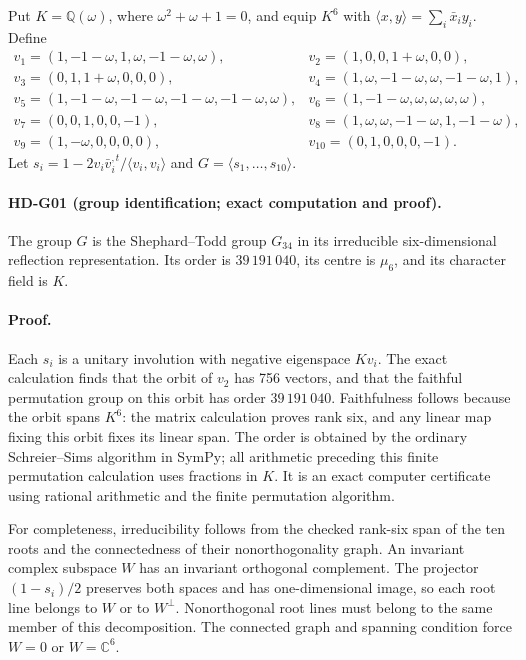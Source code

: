 Put $K=\mathbb Q(\omega)$, where $\omega^2+\omega+1=0$, and equip
$K^6$ with $\langle x,y\rangle=\sum_i\bar x_i y_i$. Define
\[
\begin{array}{ll}
v_1=(1,-1-\omega,1,\omega,-1-\omega,\omega),&
v_2=(1,0,0,1+\omega,0,0),\\
v_3=(0,1,1+\omega,0,0,0),&
v_4=(1,\omega,-1-\omega,\omega,-1-\omega,1),\\
v_5=(1,-1-\omega,-1-\omega,-1-\omega,-1-\omega,\omega),&
v_6=(1,-1-\omega,\omega,\omega,\omega,\omega),\\
v_7=(0,0,1,0,0,-1),&
v_8=(1,\omega,\omega,-1-\omega,1,-1-\omega),\\
v_9=(1,-\omega,0,0,0,0),&v_{10}=(0,1,0,0,0,-1).
\end{array}
\]
Let $s_i=1-2v_i\bar v_i^{,t}/\langle v_i,v_i\rangle$ and
$G=\langle s_1,\ldots,s_{10}\rangle$.

\paragraph{HD-G01 (group identification; exact computation and proof).}
The group $G$ is the Shephard--Todd group $G_{34}$ in its irreducible
six-dimensional reflection representation. Its order is $39\,191\,040$,
its centre is $\mu_6$, and its character field is $K$.

\paragraph{Proof.}
Each $s_i$ is a unitary involution with negative eigenspace $Kv_i$.
The exact calculation finds that the orbit of $v_2$ has 756 vectors,
and that the faithful permutation group on this orbit has order
$39\,191\,040$. Faithfulness follows because the orbit spans $K^6$:
the matrix calculation proves rank six, and any linear map fixing this
orbit fixes its linear span. The order is obtained by the ordinary
Schreier--Sims algorithm in SymPy; all arithmetic preceding this finite
permutation calculation uses fractions in $K$. It is an exact computer
certificate using rational arithmetic and the finite permutation algorithm.

For completeness, irreducibility follows from the checked rank-six span
of the ten roots and the connectedness of their nonorthogonality graph.
An invariant complex subspace $W$ has an invariant orthogonal complement.
The projector $(1-s_i)/2$ preserves both spaces and has one-dimensional
image, so each root line belongs to $W$ or to $W^\perp$. Nonorthogonal
root lines must belong to the same member of this decomposition. The
connected graph and spanning condition force $W=0$ or $W=\mathbb C^6$.

